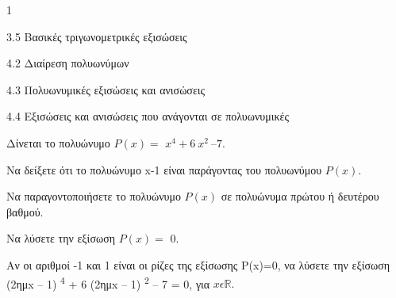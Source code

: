 \begin{ylh}{1}
\item 3.5 Βασικές τριγωνομετρικές εξισώσεις
\item 4.2 Διαίρεση πολυωνύμων
\item 4.3 Πολυωνυμικές εξισώσεις και ανισώσεις
\item 4.4 Εξισώσεις και ανισώσεις που ανάγονται σε πολυωνυμικές
\end{ylh}
Δίνεται το πολυώνυμο $P(x) =$ $x^{4} + 6{\ x}^{2}\ –7$.
\begin{alist}
\item Να δείξετε ότι το πολυώνυμο x-1 είναι παράγοντας του πολυωνύμου $P(x).$
\item Να παραγοντοποιήσετε το πολυώνυμο $P(x)$ σε πολυώνυμα πρώτου ή δευτέρου βαθμού.
\item
\begin{rlist}
\item Να λύσετε την εξίσωση $P(x) =$ 0. 
\item Αν οι αριθμοί -1 και 1 είναι οι ρίζες της εξίσωσης P(x)=0, να λύσετε την εξίσωση
(2ημx -- 1) \textsuperscript{4} + 6 (2ημx -- 1) \textsuperscript{2} -- 7 = 0, για $x\epsilon\mathbb{R.}$
\end{rlist}
\end{alist}

